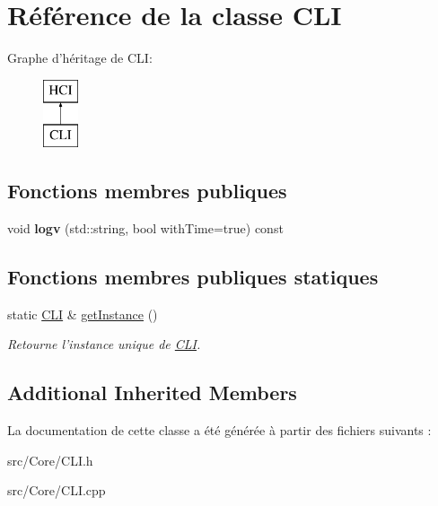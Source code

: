 \hypertarget{classCLI}{\section{Référence de la classe C\-L\-I}
\label{classCLI}
}
Graphe d'héritage de C\-L\-I\-:\begin{figure}[H]
\begin{center}
\leavevmode
\includegraphics[height=2.000000cm]{classCLI}
\end{center}
\end{figure}
\subsection*{Fonctions membres publiques}
\begin{DoxyCompactItemize}
\item 
\hypertarget{classCLI_a43ec846cf90e311e7867d4315d4e559c}{void {\bfseries logv} (std\-::string, bool with\-Time=true) const }\label{classCLI_a43ec846cf90e311e7867d4315d4e559c}

\end{DoxyCompactItemize}
\subsection*{Fonctions membres publiques statiques}
\begin{DoxyCompactItemize}
\item 
\hypertarget{classCLI_afb0099de9473ff74480fa40cec78a3ac}{static \hyperlink{classCLI}{C\-L\-I} \& \hyperlink{classCLI_afb0099de9473ff74480fa40cec78a3ac}{get\-Instance} ()}\label{classCLI_afb0099de9473ff74480fa40cec78a3ac}

\begin{DoxyCompactList}\small\item\em Retourne l'instance unique de \hyperlink{classCLI}{C\-L\-I}. \end{DoxyCompactList}\end{DoxyCompactItemize}
\subsection*{Additional Inherited Members}


La documentation de cette classe a été générée à partir des fichiers suivants \-:\begin{DoxyCompactItemize}
\item 
src/\-Core/C\-L\-I.\-h\item 
src/\-Core/C\-L\-I.\-cpp\end{DoxyCompactItemize}
